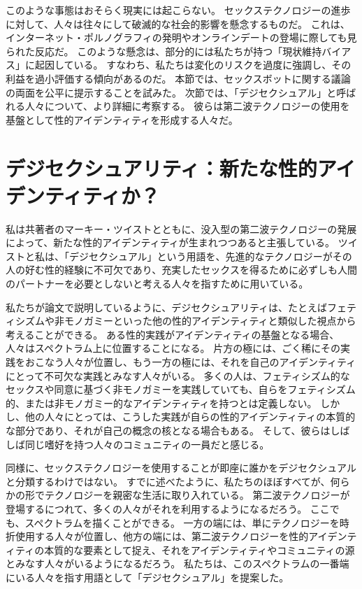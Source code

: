 \documentclass[paper=a4,book,openany]{jlreq}
\begin{document}
このような事態はおそらく現実には起こらない。
セックステクノロジーの進歩に対して、人々は往々にして破滅的な社会的影響を懸念するものだ。
これは、インターネット・ポルノグラフィの発明やオンラインデートの登場に際しても見られた反応だ。
このような懸念は、部分的には私たちが持つ「現状維持バイアス」に起因している。
すなわち、私たちは変化のリスクを過度に強調し、その利益を過小評価する傾向があるのだ。
本節では、セックスボットに関する議論の両面を公平に提示することを試みた。
次節では、「デジセクシュアル」と呼ばれる人々について、より詳細に考察する。
彼らは第二波テクノロジーの使用を基盤として性的アイデンティティを形成する人々だ。

\section{デジセクシュアリティ：新たな性的アイデンティティか？}

私は共著者のマーキー・ツイストとともに、没入型の第二波テクノロジーの発展によって、新たな性的アイデンティティが生まれつつあると主張している。
ツイストと私は、「デジセクシュアル」という用語を、先進的なテクノロジーがその人の好む性的経験に不可欠であり、充実したセックスを得るために必ずしも人間のパートナーを必要としないと考える人々を指すために用いている\citep[pp.4--6]{mcarthur17:_rise_digis}。

私たちが論文で説明しているように、デジセクシュアリティは、たとえばフェティシズムや非モノガミーといった他の性的アイデンティティと類似した視点から考えることができる。
ある性的実践がアイデンティティの基盤となる場合、人々はスペクトラム上に位置することになる。
片方の極には、ごく稀にその実践をおこなう人々が位置し、もう一方の極には、それを自己のアイデンティティにとって不可欠な実践とみなす人々がいる。
多くの人は、フェティシズム的なセックスや同意に基づく非モノガミーを実践していても、自らをフェティシズム的、または非モノガミー的なアイデンティティを持つとは定義しない。
しかし、他の人々にとっては、こうした実践が自らの性的アイデンティティの本質的な部分であり、それが自己の概念の核となる場合もある。
そして、彼らはしばしば同じ嗜好を持つ人々のコミュニティの一員だと感じる。

同様に、セックステクノロジーを使用することが即座に誰かをデジセクシュアルと分類するわけではない。
すでに述べたように、私たちのほぼすべてが、何らかの形でテクノロジーを親密な生活に取り入れている。
第二波テクノロジーが登場するにつれて、多くの人々がそれを利用するようになるだろう。
ここでも、スペクトラムを描くことができる。
一方の端には、単にテクノロジーを時折使用する人々が位置し、他方の端には、第二波テクノロジーを性的アイデンティティの本質的な要素として捉え、それをアイデンティティやコミュニティの源とみなす人々がいるようになるだろう。
私たちは、このスペクトラムの一番端にいる人々を指す用語として「デジセクシュアル」を提案した。
\end{document}
